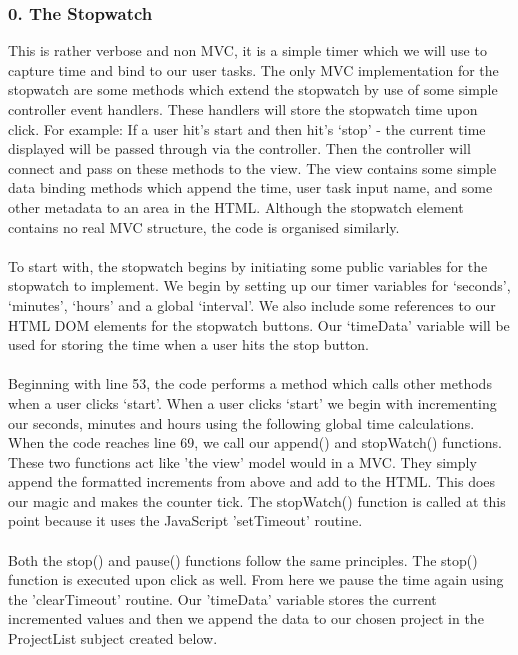 \documentclass[paper=a4, fontsize=10pt]{article}
\begin{document}
\subsubsection*{0. The Stopwatch}
This is rather verbose and non MVC, it is a simple timer which we will use to capture time and bind to our user tasks. The only MVC implementation for the stopwatch are some methods which extend the stopwatch by use of some simple controller event handlers. These handlers will store the stopwatch time upon click. For example: If a user hit's start and then hit's `stop' - the current time displayed will be passed through via the controller. Then the controller will connect and pass on these methods to the view. The view contains some simple data binding methods which append the time, user task input name, and some other metadata to an area in the HTML. Although the stopwatch element contains no real MVC structure, the code is organised similarly. 
\\\\
To start with, the stopwatch begins by initiating some public variables for the stopwatch to implement. We begin by setting up our timer variables for `seconds', `minutes', `hours' and a global `interval'. We also include some references to our HTML DOM elements for the stopwatch buttons. Our `timeData' variable will be used for storing the time when a user hits the stop button. 
\\\\
Beginning with line 53, the code performs a method which calls other methods when a user clicks `start'. When a user clicks `start' we begin with incrementing our seconds, minutes and hours using the following global time calculations. When the code reaches line 69, we call our append() and stopWatch() functions. These two functions act like 'the view' model would in a MVC. They simply append the formatted increments from above and add to the HTML. This does our magic and makes the counter tick. The stopWatch() function is called at this point because it uses the JavaScript 'setTimeout' routine. 
\\\\
Both the stop() and pause() functions follow the same principles. The stop() function is executed upon click as well. From here we pause the time again using the 'clearTimeout' routine. Our 'timeData' variable stores the current incremented values and then we append the data to our chosen project in the ProjectList subject created below.
\end{document}
